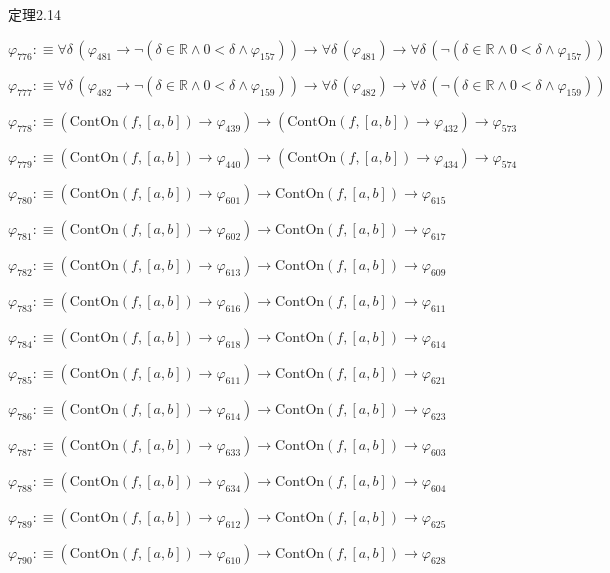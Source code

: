 \begin{fullproof}{定理2.14}
\begin{abbrevlist}
\item $\varphi_{776} :\equiv \forall \delta\,(\varphi_{481} \to \neg (\delta \in \mathbb{R} \land 0 < \delta \land \varphi_{157})) \to \forall \delta\,(\varphi_{481}) \to \forall \delta\,(\neg (\delta \in \mathbb{R} \land 0 < \delta \land \varphi_{157}))$
\item $\varphi_{777} :\equiv \forall \delta\,(\varphi_{482} \to \neg (\delta \in \mathbb{R} \land 0 < \delta \land \varphi_{159})) \to \forall \delta\,(\varphi_{482}) \to \forall \delta\,(\neg (\delta \in \mathbb{R} \land 0 < \delta \land \varphi_{159}))$
\item $\varphi_{778} :\equiv (\mathrm{ContOn}(f,[a,b]) \to \varphi_{439}) \to (\mathrm{ContOn}(f,[a,b]) \to \varphi_{432}) \to \varphi_{573}$
\item $\varphi_{779} :\equiv (\mathrm{ContOn}(f,[a,b]) \to \varphi_{440}) \to (\mathrm{ContOn}(f,[a,b]) \to \varphi_{434}) \to \varphi_{574}$
\item $\varphi_{780} :\equiv (\mathrm{ContOn}(f,[a,b]) \to \varphi_{601}) \to \mathrm{ContOn}(f,[a,b]) \to \varphi_{615}$
\item $\varphi_{781} :\equiv (\mathrm{ContOn}(f,[a,b]) \to \varphi_{602}) \to \mathrm{ContOn}(f,[a,b]) \to \varphi_{617}$
\item $\varphi_{782} :\equiv (\mathrm{ContOn}(f,[a,b]) \to \varphi_{613}) \to \mathrm{ContOn}(f,[a,b]) \to \varphi_{609}$
\item $\varphi_{783} :\equiv (\mathrm{ContOn}(f,[a,b]) \to \varphi_{616}) \to \mathrm{ContOn}(f,[a,b]) \to \varphi_{611}$
\item $\varphi_{784} :\equiv (\mathrm{ContOn}(f,[a,b]) \to \varphi_{618}) \to \mathrm{ContOn}(f,[a,b]) \to \varphi_{614}$
\item $\varphi_{785} :\equiv (\mathrm{ContOn}(f,[a,b]) \to \varphi_{611}) \to \mathrm{ContOn}(f,[a,b]) \to \varphi_{621}$
\item $\varphi_{786} :\equiv (\mathrm{ContOn}(f,[a,b]) \to \varphi_{614}) \to \mathrm{ContOn}(f,[a,b]) \to \varphi_{623}$
\item $\varphi_{787} :\equiv (\mathrm{ContOn}(f,[a,b]) \to \varphi_{633}) \to \mathrm{ContOn}(f,[a,b]) \to \varphi_{603}$
\item $\varphi_{788} :\equiv (\mathrm{ContOn}(f,[a,b]) \to \varphi_{634}) \to \mathrm{ContOn}(f,[a,b]) \to \varphi_{604}$
\item $\varphi_{789} :\equiv (\mathrm{ContOn}(f,[a,b]) \to \varphi_{612}) \to \mathrm{ContOn}(f,[a,b]) \to \varphi_{625}$
\item $\varphi_{790} :\equiv (\mathrm{ContOn}(f,[a,b]) \to \varphi_{610}) \to \mathrm{ContOn}(f,[a,b]) \to \varphi_{628}$

\end{abbrevlist}
\end{fullproof}
